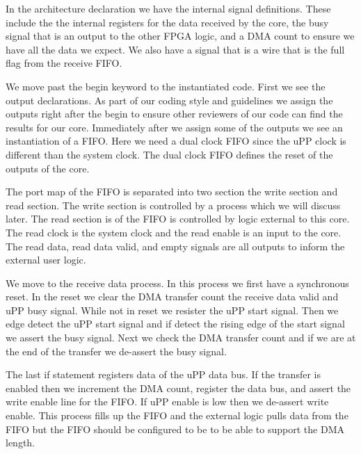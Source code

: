 In the architecture declaration we have the internal signal definitions. These include the the internal registers for the data received by the core, the busy signal that is an output to the other \ac{FPGA} logic, and a \ac{DMA} count to ensure we have all the data we expect. We also have a signal that is a wire that is the full flag from the receive \ac{FIFO}.

We move past the begin keyword to the instantiated code. First we see the output declarations. As part of our coding style and guidelines we assign the outputs right after the begin to ensure other reviewers of our code can find the results for our core. Immediately after we assign some of the outputs we see an instantiation of a \ac{FIFO}. Here we need a dual clock \ac{FIFO} since the \ac{uPP} clock is different than the system clock. The dual clock \ac{FIFO} defines the reset of the outputs of the core. 

The port map of the \ac{FIFO} is separated into two section the write section and read section. The write section is controlled by a process which we will discuss later. The read section is of the \ac{FIFO} is controlled by logic external to this core. The read clock is the system clock and the read enable is an input to the core. The read data, read data valid, and empty signals are all outputs to inform the external user logic. 

We move to the receive data process. In this process we first have a synchronous reset. In the reset we clear the \ac{DMA} transfer count the receive data valid and \ac{uPP} busy signal. While not in reset we resister the \ac{uPP} start signal. Then we edge detect the \ac{uPP} start signal and if detect the rising edge of the start signal we assert the busy signal. Next we check the \ac{DMA} transfer count and if we are at the end of the transfer we de-assert the busy signal. 

The last if statement registers data of the \ac{uPP} data bus. If the transfer is enabled then we increment the \ac{DMA} count, register the data bus, and assert the write enable line for the \ac{FIFO}. If \ac{uPP} enable is low then we de-assert write enable. This process fills up the \ac{FIFO} and the external logic pulls data from the \ac{FIFO} but the \ac{FIFO} should be configured to be to be able to support the \ac{DMA} length. 

